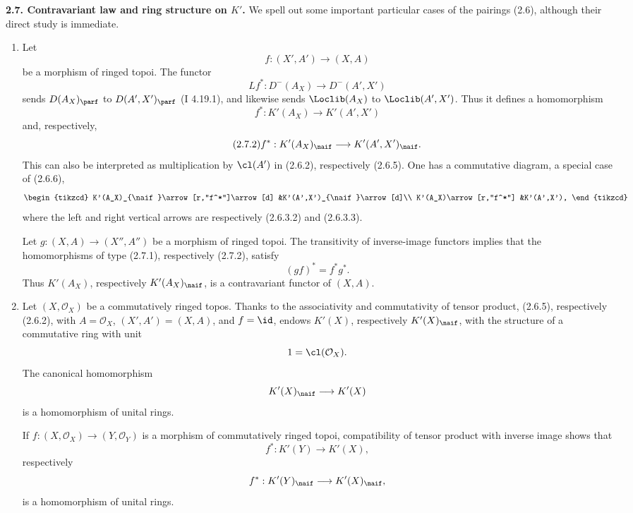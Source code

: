 \textbf{2.7. Contravariant law and ring structure on \(K'\).} We spell out some important particular cases of the pairings (2.6), although their direct study is immediate.
\begin{enumerate}[label=\alph*)]
\item Let
\[
 f:(X',A')\longrightarrow (X,A)
\]
be a morphism of ringed topoi. The functor
\[
 Lf^*:D^-(A_X)\longrightarrow D^-(A',X')
\]
sends \(D(A_X)_{\parf}\) to \(D(A',X')_{\parf}\) (I 4.19.1), and likewise sends \(\Loclib(A_X)\) to \(\Loclib(A',X')\). Thus it defines a homomorphism
\begin{equation}\tag{2.7.1}
 f^*:K'(A_X)\longrightarrow K'(A',X')
\end{equation}
and, respectively,
\begin{equation}\tag{2.7.2}
 f^*:K'(A_X)_{\naif}\longrightarrow K'(A',X')_{\naif}.
\end{equation}
This can also be interpreted as multiplication by \(\cl(A')\) in (2.6.2), respectively (2.6.5). One has a commutative diagram, a special case of (2.6.6),
\[
\begin{tikzcd}
K'(A_X)_{\naif}\arrow[r,"f^*"]\arrow[d]
&K'(A',X')_{\naif}\arrow[d]\\
K'(A_X)\arrow[r,"f^*"]
&K'(A',X'),
\end{tikzcd}
\]
where the left and right vertical arrows are respectively (2.6.3.2) and (2.6.3.3).

Let \(g:(X,A)\to(X'',A'')\) be a morphism of ringed topoi. The transitivity of inverse-image functors implies that the homomorphisms of type (2.7.1), respectively (2.7.2), satisfy
\begin{equation}\tag{2.7.3}
 (gf)^*=f^*g^*.
\end{equation}
Thus \(K'(A_X)\), respectively \(K'(A_X)_{\naif}\), is a contravariant functor of \((X,A)\).

\item Let \((X,\mathcal O_X)\) be a commutatively ringed topos. Thanks to the associativity and commutativity of tensor product, (2.6.5), respectively (2.6.2), with \(A=\mathcal O_X\), \((X',A')=(X,A)\), and \(f=\id\), endows \(K'(X)\), respectively \(K'(X)_{\naif}\), with the structure of a commutative ring with unit
\[
 1=\cl(\mathcal O_X).
\]
The canonical homomorphism
\[
 K'(X)_{\naif}\longrightarrow K'(X)
\]
is a homomorphism of unital rings.

If \(f:(X,\mathcal O_X)\to(Y,\mathcal O_Y)\) is a morphism of commutatively ringed topoi, compatibility of tensor product with inverse image shows that
\[
 f^*:K'(Y)\longrightarrow K'(X),
\]
respectively
\[
 f^*:K'(Y)_{\naif}\longrightarrow K'(X)_{\naif},
\]
is a homomorphism of unital rings.
\end{enumerate}

